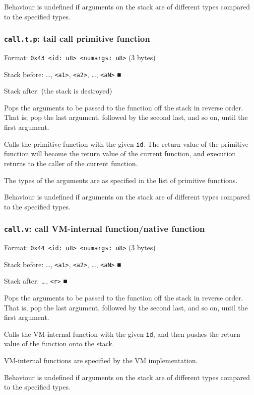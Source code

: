 \documentclass[11pt]{article}
\begin{document}
Behaviour is undefined if arguments on the stack are of different types
compared to the specified types.

\subsubsection{\texttt{call.t.p}: tail call primitive function}
\label{sec:orgd22c74d}
Format: \texttt{0x43 <id: u8> <numargs: u8>} (3 bytes)

Stack before: \ldots{}​, \texttt{<a1>}, \texttt{<a2>}, \ldots{}​, \texttt{<aN>} ■

Stack after: (the stack is destroyed)

Pops the arguments to be passed to the function off the stack in reverse
order. That is, pop the last argument, followed by the second last, and
so on, until the first argument.

Calls the primitive function with the given \texttt{id}. The return value of
the primitive function will become the return value of the current
function, and execution returns to the caller of the current function.

The types of the arguments are as specified in the list of primitive
functions.

Behaviour is undefined if arguments on the stack are of different types
compared to the specified types.

\subsubsection{\texttt{call.v}: call VM-internal function/native function}
\label{sec:org008ae6e}
Format: \texttt{0x44 <id: u8> <numargs: u8>} (3 bytes)

Stack before: \ldots{}​, \texttt{<a1>}, \texttt{<a2>}, \ldots{}​, \texttt{<aN>} ■

Stack after: \ldots{}​, \texttt{<r>} ■

Pops the arguments to be passed to the function off the stack in reverse
order. That is, pop the last argument, followed by the second last, and
so on, until the first argument.

Calls the VM-internal function with the given \texttt{id}, and then pushes the
return value of the function onto the stack.

VM-internal functions are specified by the VM implementation.

Behaviour is undefined if arguments on the stack are of different types
compared to the specified types.
\end{document}
